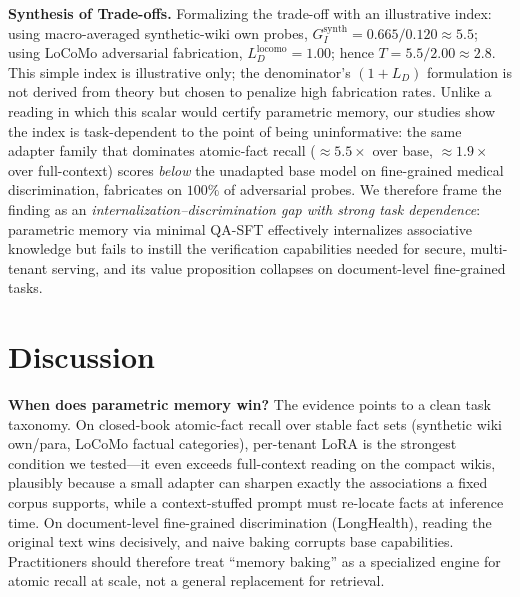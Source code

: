 \documentclass[conference]{IEEEtran}
\begin{document}
\textbf{Synthesis of Trade-offs.} Formalizing the trade-off with an illustrative index: using macro-averaged synthetic-wiki own probes, $G_I^{\text{synth}} = 0.665 / 0.120 \approx 5.5$; using LoCoMo adversarial fabrication, $L_D^{\text{locomo}} = 1.00$; hence $T = 5.5 / 2.00 \approx 2.8$. This simple index is illustrative only; the denominator's $(1+L_D)$ formulation is not derived from theory but chosen to penalize high fabrication rates. Unlike a reading in which this scalar would certify parametric memory, our studies show the index is task-dependent to the point of being uninformative: the same adapter family that dominates atomic-fact recall ($\approx 5.5\times$ over base, $\approx 1.9\times$ over full-context) scores \emph{below} the unadapted base model on fine-grained medical discrimination, fabricates on $100\%$ of adversarial probes. We therefore frame the finding as an \textit{internalization--discrimination gap with strong task dependence}: parametric memory via minimal QA-SFT effectively internalizes associative knowledge but fails to instill the verification capabilities needed for secure, multi-tenant serving, and its value proposition collapses on document-level fine-grained tasks.

\section{Discussion}
\textbf{When does parametric memory win?} The evidence points to a clean task taxonomy. On closed-book atomic-fact recall over stable fact sets (synthetic wiki own/para, LoCoMo factual categories), per-tenant LoRA is the strongest condition we tested---it even exceeds full-context reading on the compact wikis, plausibly because a small adapter can sharpen exactly the associations a fixed corpus supports, while a context-stuffed prompt must re-locate facts at inference time. On document-level fine-grained discrimination (LongHealth), reading the original text wins decisively, and naive baking corrupts base capabilities. Practitioners should therefore treat ``memory baking'' as a specialized engine for atomic recall at scale, not a general replacement for retrieval.
\end{document}
